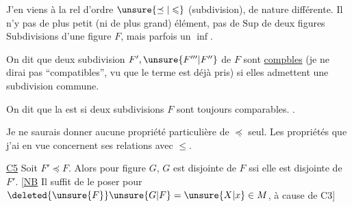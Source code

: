 J'en viens à la rel d'ordre $\unsure{\preceq|\leqslant}$ (subdivision), de nature  différente. Il n'y  pas de plus petit (ni de plus grand) élément, pas de $\mathrm{Sup}$ de deux  figures    Subdivisions d'une  figure $F$, mais parfois un $\inf$.

On dit que deux subdivision $F',\unsure{F'''|F''}$ de $F$ sont \uline{compbles}  (je ne dirai pas ``compatibles'', vu que le terme est déjà pris) si elles admettent une subdivision commune.


On dit que la  est  si deux subdivisions   $F$ sont toujours comparables.  .

 Je ne saurais donner aucune propriété particulière de $\preceq$  seul. Les propriétés que j'ai en vue concernent ses relations avec $\leq$.

\uline{C5} Soit $F'\preceq F$. Alors pour  figure $G$, $G$ est disjointe de $F$ ssi elle est disjointe de $F'$. [\uline{NB} Il suffit de le poser pour $\deleted{\unsure{F}}\unsure{G|F}=\unsure{X|x}\in M$, à cause de C3]
